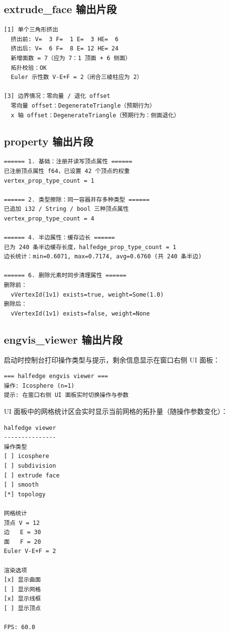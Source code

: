 \documentclass[11pt,a4paper]{article}
\begin{document}
\subsection{extrude\_face 输出片段}

\begin{lstlisting}
[1] 单个三角形挤出
  挤出前: V=  3 F=  1 E=  3 HE=  6
  挤出后: V=  6 F=  8 E= 12 HE= 24
  新增面数 = 7（应为 7：1 顶面 + 6 侧面）
  拓扑校验：OK
  Euler 示性数 V-E+F = 2（闭合三棱柱应为 2）

[3] 边界情况：零向量 / 退化 offset
  零向量 offset：DegenerateTriangle（预期行为）
  x 轴 offset：DegenerateTriangle（预期行为：侧面退化）
\end{lstlisting}

\subsection{property 输出片段}

\begin{lstlisting}
====== 1. 基础：注册并读写顶点属性 ======
已注册顶点属性 f64，已设置 42 个顶点的权重
vertex_prop_type_count = 1

====== 2. 类型擦除：同一容器并存多种类型 ======
已追加 i32 / String / bool 三种顶点属性
vertex_prop_type_count = 4

====== 4. 半边属性：缓存边长 ======
已为 240 条半边缓存长度，halfedge_prop_type_count = 1
边长统计：min=0.6071, max=0.7174, avg=0.6760 (共 240 条半边)

====== 6. 删除元素时同步清理属性 ======
删除前：
  vVertexId(1v1) exists=true, weight=Some(1.0)
删除后：
  vVertexId(1v1) exists=false, weight=None
\end{lstlisting}

\subsection{engvis\_viewer 输出片段}

启动时控制台打印操作类型与提示，剩余信息显示在窗口右侧 UI 面板：

\begin{lstlisting}
=== halfedge engvis viewer ===
操作: Icosphere (n=1)
提示: 在窗口右侧 UI 面板实时切换操作与参数
\end{lstlisting}

UI 面板中的网格统计区会实时显示当前网格的拓扑量（随操作参数变化）：

\begin{lstlisting}
halfedge viewer
---------------
操作类型
[ ] icosphere
[ ] subdivision
[ ] extrude face
[ ] smooth
[*] topology

网格统计
顶点 V = 12
边   E = 30
面   F = 20
Euler V-E+F = 2

渲染选项
[x] 显示曲面
[ ] 显示网格
[x] 显示线框
[ ] 显示顶点

FPS: 60.0
\end{lstlisting}
\end{document}
